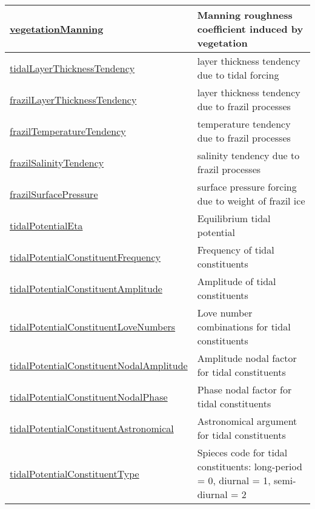 {\begin{center}
\begin{longtable}{| p{2.0in} | p{4.0in} |}
    \hline
    \hyperref[subsec:var_sec_forcing_vegetationManning]{vegetationManning} & Manning roughness coefficient induced by vegetation \\
    \hline
    \hyperref[subsec:var_sec_forcing_tidalLayerThicknessTendency]{tidalLayerThicknessTendency} & layer thickness tendency due to tidal forcing \\
    \hline
    \hyperref[subsec:var_sec_forcing_frazilLayerThicknessTendency]{frazilLayerThicknessTendency} & layer thickness tendency due to frazil processes \\
    \hline
    \hyperref[subsec:var_sec_forcing_frazilTemperatureTendency]{frazilTemperatureTendency} & temperature tendency due to frazil processes \\
    \hline
    \hyperref[subsec:var_sec_forcing_frazilSalinityTendency]{frazilSalinityTendency} & salinity tendency due to frazil processes \\
    \hline
    \hyperref[subsec:var_sec_forcing_frazilSurfacePressure]{frazilSurfacePressure} & surface pressure forcing due to weight of frazil ice \\
    \hline
    \hyperref[subsec:var_sec_forcing_tidalPotentialEta]{tidalPotentialEta} & Equilibrium tidal potential \\
    \hline
    \hyperref[subsec:var_sec_forcing_tidalPotentialConstituentFrequency]{tidalPotentialConstituent\-Frequency} & Frequency of tidal constituents \\
    \hline
    \hyperref[subsec:var_sec_forcing_tidalPotentialConstituentAmplitude]{tidalPotentialConstituent\-Amplitude} & Amplitude of tidal constituents \\
    \hline
    \hyperref[subsec:var_sec_forcing_tidalPotentialConstituentLoveNumbers]{tidalPotentialConstituentLove\-Numbers} & Love number combinations for tidal constituents \\
    \hline
    \hyperref[subsec:var_sec_forcing_tidalPotentialConstituentNodalAmplitude]{tidalPotentialConstituentNodal\-Amplitude} & Amplitude nodal factor for tidal constituents \\
    \hline
    \hyperref[subsec:var_sec_forcing_tidalPotentialConstituentNodalPhase]{tidalPotentialConstituentNodal\-Phase} & Phase nodal factor for tidal constituents \\
    \hline
    \hyperref[subsec:var_sec_forcing_tidalPotentialConstituentAstronomical]{tidalPotentialConstituent\-Astronomical} & Astronomical argument for tidal constituents \\
    \hline
    \hyperref[subsec:var_sec_forcing_tidalPotentialConstituentType]{tidalPotentialConstituentType} & Spieces code for tidal constituents: long-period = 0, diurnal = 1, semi-diurnal = 2 \\

\end{longtable}
\end{center}}
